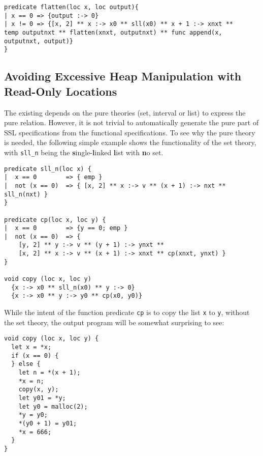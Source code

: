 \begin{lstlisting}[language=SynLang]
predicate flatten(loc x, loc output){
| x == 0 => {output :-> 0}
| x != 0 => {[x, 2] ** x :-> x0 ** sll(x0) ** x + 1 :-> xnxt ** 
temp outputnxt ** flatten(xnxt, outputnxt) ** func append(x, outputnxt, output)}
}
\end{lstlisting}

\subsection{Avoiding Excessive Heap Manipulation with Read-Only Locations}

The existing \suslik depends on the pure theories (set, interval or list) to express the pure
relation. However, it is not trivial to automatically generate the
pure part of SSL specifications from the functional specifications. To
see why the pure theory is needed, the following simple example shows
the functionality of the set theory, with \lstinline{sll_n} being the
\textbf{s}ingle-\textbf{l}inked \textbf{l}ist with \textbf{n}o set.

\begin{lstlisting}[language=SynLang]
predicate sll_n(loc x) {
|  x == 0        => { emp }
|  not (x == 0)  => { [x, 2] ** x :-> v ** (x + 1) :-> nxt ** sll_n(nxt) }
}

predicate cp(loc x, loc y) {
|  x == 0        => {y == 0; emp }
|  not (x == 0)  => {
    [y, 2] ** y :-> v ** (y + 1) :-> ynxt **
    [x, 2] ** x :-> v ** (x + 1) :-> xnxt ** cp(xnxt, ynxt) }
}

void copy (loc x, loc y)
  {x :-> x0 ** sll_n(x0) ** y :-> 0}
  {x :-> x0 ** y :-> y0 ** cp(x0, y0)}
\end{lstlisting}

While the intent of the function predicate \lstinline{cp} is to copy
the list \lstinline{x} to \lstinline{y}, without the set theory, the
output program will be somewhat surprising to see:

\begin{lstlisting}[language=SynLang]
void copy (loc x, loc y) {
  let x = *x;
  if (x == 0) {
  } else {
    let n = *(x + 1);
    *x = n;
    copy(x, y);
    let y01 = *y;
    let y0 = malloc(2);
    *y = y0;
    *(y0 + 1) = y01;
    *x = 666;
  }
}
\end{lstlisting}

